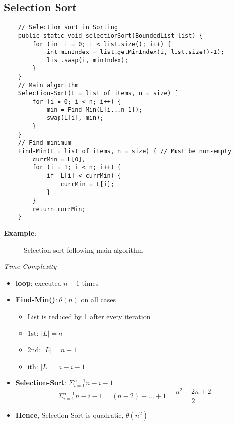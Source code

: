 \documentclass[10pt, 
a4paper, 
oneside, 
headinclude, footinclude, 
BCOR5mm]
{scrartcl}
\begin{document}
\subsection{Selection Sort}
\begin{lstlisting}
    // Selection sort in Sorting
    public static void selectionSort(BoundedList list) {
        for (int i = 0; i < list.size(); i++) {
            int minIndex = list.getMinIndex(i, list.size()-1);
            list.swap(i, minIndex);
        }
    }
    // Main algorithm
    Selection-Sort(L = list of items, n = size) {
        for (i = 0; i < n; i++) {
            min = Find-Min(L[i...n-1]);
            swap(L[i], min);
        }
    }
    // Find minimum
    Find-Min(L = list of items, n = size) { // Must be non-empty
        currMin = L[0];
        for (i = 1; i < n; i++) {
            if (L[i] < currMin) {
                currMin = L[i];
            }
        }
        return currMin;
    }
\end{lstlisting}
\textbf{Example}:
\begin{figure}
    \begin{center}
        \caption{Selection sort following main algorithm}
    \end{center}
\end{figure}

\begin{definition}
    \textit{Time Complexity}
    \begin{itemize}
        \item \textbf{loop}: executed $n-1$ times
        \item \textbf{Find-Min()}: $\theta(n)$ on all cases
        \begin{itemize}
            \item List is reduced by 1 after every iteration
            \item 1st: $|L|=n$
            \item 2nd: $|L|=n-1$
            \item ith: $|L|=n-i-1$
        \end{itemize}
        \item \textbf{Selection-Sort}: $\Sigma^{n-1}_{i=1}n-i-1$ $$\Sigma^{n-1}_{i=1}n-i-1=(n-2)+...+1=\frac{n^2-2n+2}{2}$$
        \item \textbf{Hence}, Selection-Sort is quadratic, $\theta(n^2)$
    \end{itemize}
\end{definition}
\newpage
\end{document}
